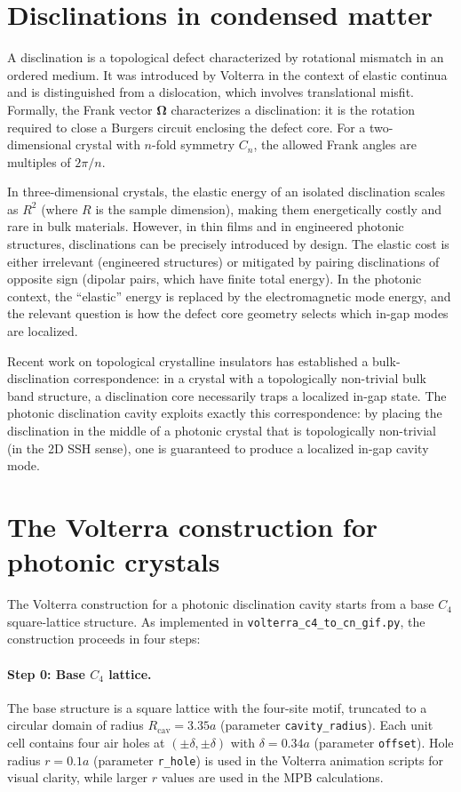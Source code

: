 \documentclass[12pt,a4paper,oneside]{book}
\theoremstyle{plain}
\theoremstyle{definition}
\theoremstyle{remark}
\newcommand{\vb}[1]{\bm{#1}}
\begin{document}
\section{Disclinations in condensed matter}
\label{sec:disclinations-cm}

A disclination is a topological defect characterized by rotational mismatch in an ordered medium. It was introduced by Volterra in the context of elastic continua and is distinguished from a dislocation, which involves translational misfit. Formally, the Frank vector $\vb{\Omega}$ characterizes a disclination: it is the rotation required to close a Burgers circuit enclosing the defect core. For a two-dimensional crystal with $n$-fold symmetry $C_n$, the allowed Frank angles are multiples of $2\pi/n$.

In three-dimensional crystals, the elastic energy of an isolated disclination scales as $R^2$ (where $R$ is the sample dimension), making them energetically costly and rare in bulk materials. However, in thin films and in engineered photonic structures, disclinations can be precisely introduced by design. The elastic cost is either irrelevant (engineered structures) or mitigated by pairing disclinations of opposite sign (dipolar pairs, which have finite total energy). In the photonic context, the ``elastic'' energy is replaced by the electromagnetic mode energy, and the relevant question is how the defect core geometry selects which in-gap modes are localized.

Recent work on topological crystalline insulators has established a bulk-disclination correspondence: in a crystal with a topologically non-trivial bulk band structure, a disclination core necessarily traps a localized in-gap state. The photonic disclination cavity exploits exactly this correspondence: by placing the disclination in the middle of a photonic crystal that is topologically non-trivial (in the 2D SSH sense), one is guaranteed to produce a localized in-gap cavity mode.

\section{The Volterra construction for photonic crystals}
\label{sec:volterra}

The Volterra construction for a photonic disclination cavity starts from a base $C_4$ square-lattice structure. As implemented in \texttt{volterra\_c4\_to\_cn\_gif.py}, the construction proceeds in four steps:

\paragraph{Step 0: Base $C_4$ lattice.} The base structure is a square lattice with the four-site motif, truncated to a circular domain of radius $R_\mathrm{cav} = 3.35a$ (parameter \texttt{cavity\_radius}). Each unit cell contains four air holes at $(\pm\delta,\pm\delta)$ with $\delta = 0.34a$ (parameter \texttt{offset}). Hole radius $r = 0.1a$ (parameter \texttt{r\_hole}) is used in the Volterra animation scripts for visual clarity, while larger $r$ values are used in the MPB calculations.
\end{document}

